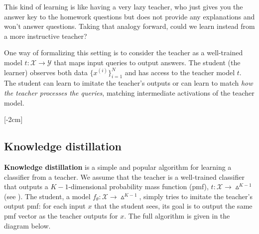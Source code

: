 This kind of learning is like having a very lazy teacher, who just gives you the answer key to the homework questions but does not provide any explanations and won't answer questions. Taking that analogy forward, could we learn instead from a more instructive teacher?

One way of formalizing this setting is to consider the teacher as a well-trained model $t: \mathcal{X} \rightarrow \mathcal{Y}$ that maps input queries to output answers. The student (the learner) observes both data $\{x^{(i)}\}^N_{i=1}$ and has access to the teacher model $t$. The student can learn to imitate the teacher's outputs or can learn to match \textit{how the teacher processes the queries}, matching intermediate activations of the teacher model.
\begin{center}
\end{center}
[-2cm]

\subsection{Knowledge distillation}
\textbf{Knowledge distillation} is a simple and popular algorithm for learning a classifier from a teacher. We assume that the teacher is a well-trained classifier that outputs a $K-1$-dimensional probability mass function (pmf), $t: \mathcal{X} \rightarrow \vartriangle^{K-1}$ (see \sect{\ref{sec:intro_to_learning:image_classification}}). The student, a model $f_{\theta}: \mathcal{X} \rightarrow \vartriangle^{K-1}$, simply tries to imitate the teacher's output pmf: for each input $x$ that the student sees, its goal is to output the same pmf vector as the teacher outputs for $x$. The full algorithm is given in the diagram below.


